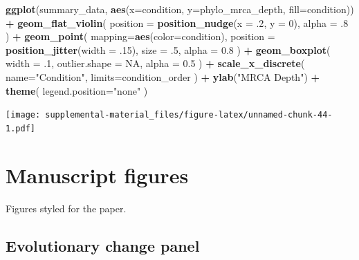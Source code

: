 \documentclass[]{book}
\newenvironment{Shaded}{\begin{snugshade}}{\end{snugshade}}
\newcommand{\DataTypeTok}[1]{\textcolor[rgb]{0.13,0.29,0.53}{#1}}
\newcommand{\DecValTok}[1]{\textcolor[rgb]{0.00,0.00,0.81}{#1}}
\newcommand{\FloatTok}[1]{\textcolor[rgb]{0.00,0.00,0.81}{#1}}
\newcommand{\KeywordTok}[1]{\textcolor[rgb]{0.13,0.29,0.53}{\textbf{#1}}}
\newcommand{\NormalTok}[1]{#1}
\newcommand{\OperatorTok}[1]{\textcolor[rgb]{0.81,0.36,0.00}{\textbf{#1}}}
\newcommand{\OtherTok}[1]{\textcolor[rgb]{0.56,0.35,0.01}{#1}}
\newcommand{\StringTok}[1]{\textcolor[rgb]{0.31,0.60,0.02}{#1}}
\begin{document}
\begin{Shaded}
\begin{Highlighting}[]
\KeywordTok{ggplot}\NormalTok{(summary_data, }\KeywordTok{aes}\NormalTok{(}\DataTypeTok{x=}\NormalTok{condition, }\DataTypeTok{y=}\NormalTok{phylo_mrca_depth, }\DataTypeTok{fill=}\NormalTok{condition)) }\OperatorTok{+}
\StringTok{  }\KeywordTok{geom_flat_violin}\NormalTok{(}
    \DataTypeTok{position =} \KeywordTok{position_nudge}\NormalTok{(}\DataTypeTok{x =} \FloatTok{.2}\NormalTok{, }\DataTypeTok{y =} \DecValTok{0}\NormalTok{),}
    \DataTypeTok{alpha =} \FloatTok{.8}
\NormalTok{  ) }\OperatorTok{+}
\StringTok{  }\KeywordTok{geom_point}\NormalTok{(}
    \DataTypeTok{mapping=}\KeywordTok{aes}\NormalTok{(}\DataTypeTok{color=}\NormalTok{condition),}
    \DataTypeTok{position =} \KeywordTok{position_jitter}\NormalTok{(}\DataTypeTok{width =} \FloatTok{.15}\NormalTok{),}
    \DataTypeTok{size =} \FloatTok{.5}\NormalTok{,}
    \DataTypeTok{alpha =} \FloatTok{0.8}
\NormalTok{  ) }\OperatorTok{+}
\StringTok{  }\KeywordTok{geom_boxplot}\NormalTok{(}
    \DataTypeTok{width =} \FloatTok{.1}\NormalTok{,}
    \DataTypeTok{outlier.shape =} \OtherTok{NA}\NormalTok{,}
    \DataTypeTok{alpha =} \FloatTok{0.5}
\NormalTok{  ) }\OperatorTok{+}
\StringTok{  }\KeywordTok{scale_x_discrete}\NormalTok{(}
    \DataTypeTok{name=}\StringTok{"Condition"}\NormalTok{,}
    \DataTypeTok{limits=}\NormalTok{condition_order}
\NormalTok{  ) }\OperatorTok{+}
\StringTok{  }\KeywordTok{ylab}\NormalTok{(}\StringTok{"MRCA Depth"}\NormalTok{) }\OperatorTok{+}
\StringTok{  }\KeywordTok{theme}\NormalTok{(}
    \DataTypeTok{legend.position=}\StringTok{"none"}
\NormalTok{  )}
\end{Highlighting}
\end{Shaded}

\texttt{[image: supplemental-material\_files/figure-latex/unnamed-chunk-44-1.pdf]}

\hypertarget{manuscript-figures}{%
\section{Manuscript figures}\label{manuscript-figures}}

Figures styled for the paper.

\hypertarget{evolutionary-change-panel}{%
\subsection{Evolutionary change panel}\label{evolutionary-change-panel}}
\end{document}
